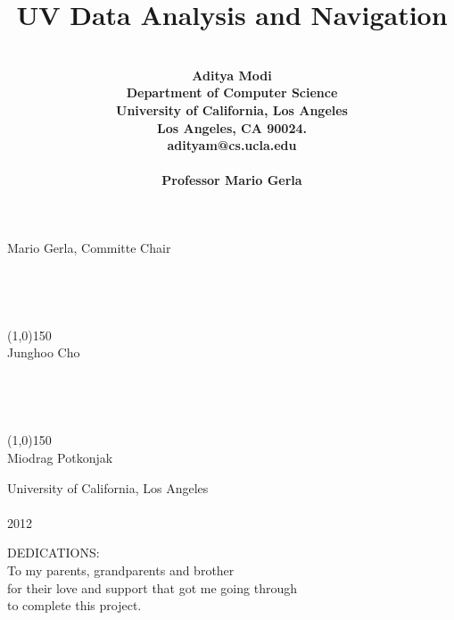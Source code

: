 \documentclass[12pt,fullpage,doublespace]{article}
\begin{document}
\hfill Mario Gerla, Committe Chair\\
\mbox{}\\
\mbox{}\\
\mbox{}\\
\mbox{}\\


\hfill\line(1,0){150}\\

\hfill Junghoo Cho\\
\mbox{}\\
\mbox{}\\
\mbox{}\\
\mbox{}\\


\hfill\line(1,0){150}\\

\hfill Miodrag Potkonjak


\null
\vfill
\begin{center}
University of California, Los Angeles\\
\mbox{}\\
2012
\end{center}
\newpage
\begin{center}
DEDICATIONS:\\
To my parents, grandparents and brother\\
for their love and support that got me going through \\
to complete this project.\\
\end{center}
\newpage
\tableofcontents
\newpage

\title{\textbf{UV Data Analysis and Navigation}}
\author{\\\bf {Aditya Modi}\\
Department of Computer Science\\
University of California, Los Angeles \\
Los Angeles, CA 90024. \\
adityam@cs.ucla.edu\\
\mbox{}\\
Professor Mario Gerla}


\date{}
\maketitle
\end{document}
